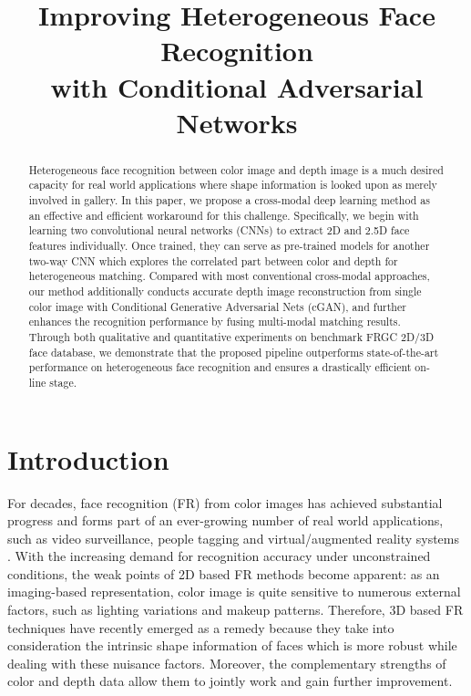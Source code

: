 \documentclass{bmvc2k}
\title{Improving Heterogeneous Face Recognition \\ with Conditional Adversarial Networks}
\begin{document}
\maketitle

\begin{abstract}
Heterogeneous face recognition between color image and depth image is a much desired capacity for real world applications where shape information is looked upon as merely involved in gallery. In this paper, we propose a cross-modal deep learning method as an effective and efficient workaround for this challenge. Specifically, we begin with learning two convolutional neural networks (CNNs) to extract 2D and 2.5D face features individually. Once trained, they can serve as pre-trained models for another two-way CNN which explores the correlated part between color and depth for heterogeneous matching. Compared with most conventional cross-modal approaches, our method additionally conducts accurate depth image reconstruction from single color image with Conditional Generative Adversarial Nets (cGAN), and further enhances the recognition performance by fusing multi-modal matching results. Through both qualitative and quantitative experiments on benchmark FRGC 2D/3D face database, we demonstrate that the proposed pipeline outperforms state-of-the-art performance on heterogeneous face recognition and ensures a drastically efficient on-line stage.
\end{abstract}

\section{Introduction}
\label{sec:intro}
For decades, face recognition (FR) from color images has achieved substantial progress and forms part of an ever-growing number of real world applications, such as video surveillance, people tagging and virtual/augmented reality systems \cite{zhao2003face, tan2006face, azeem2014survey}. With the increasing demand for recognition accuracy under unconstrained conditions, the weak points of 2D based FR methods become apparent: as an imaging-based representation, color image is quite sensitive to numerous external factors, such as lighting variations and makeup patterns. Therefore, 3D based FR techniques \cite{ding2016comprehensive, corneanu2016survey, bowyer2006survey} have recently emerged as a remedy because they take into consideration the intrinsic shape information of faces which is more robust while dealing with these nuisance factors. Moreover, the complementary strengths of color and depth data allow them to jointly work and gain further improvement. 
\end{document}
